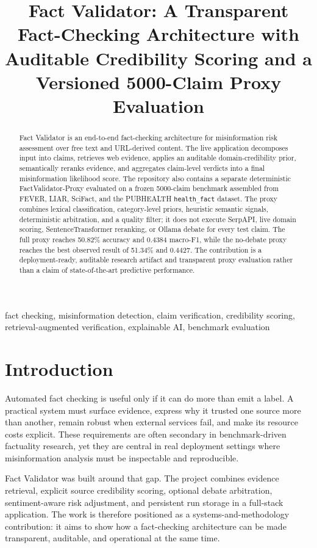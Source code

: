 \documentclass[conference]{IEEEtran}
\title{Fact Validator: A Transparent Fact-Checking Architecture with Auditable Credibility Scoring and a Versioned 5000-Claim Proxy Evaluation}
\author{\IEEEauthorblockN{Author One, Author Two, Author Three}
\IEEEauthorblockA{Department of Computer Engineering\\
University of Naples Federico II\\
Naples, Italy\\
author1@example.com, author2@example.com, author3@example.com}}
\begin{document}
\maketitle

\begin{abstract}
Fact Validator is an end-to-end fact-checking architecture for misinformation risk assessment over free text and URL-derived content. The live application decomposes input into claims, retrieves web evidence, applies an auditable domain-credibility prior, semantically reranks evidence, and aggregates claim-level verdicts into a final misinformation likelihood score. The repository also contains a separate deterministic FactValidator-Proxy evaluated on a frozen 5000-claim benchmark assembled from FEVER, LIAR, SciFact, and the PUBHEALTH \texttt{health\_fact} dataset. The proxy combines lexical classification, category-level priors, heuristic semantic signals, deterministic arbitration, and a quality filter; it does not execute SerpAPI, live domain scoring, SentenceTransformer reranking, or Ollama debate for every test claim. The full proxy reaches 50.82\% accuracy and 0.4384 macro-F1, while the no-debate proxy reaches the best observed result of 51.34\% and 0.4427. The contribution is a deployment-ready, auditable research artifact and transparent proxy evaluation rather than a claim of state-of-the-art predictive performance.
\end{abstract}

\begin{IEEEkeywords}
fact checking, misinformation detection, claim verification, credibility scoring, retrieval-augmented verification, explainable AI, benchmark evaluation
\end{IEEEkeywords}

\section{Introduction}

Automated fact checking is useful only if it can do more than emit a label. A practical system must surface evidence, express why it trusted one source more than another, remain robust when external services fail, and make its resource costs explicit. These requirements are often secondary in benchmark-driven factuality research, yet they are central in real deployment settings where misinformation analysis must be inspectable and reproducible.

Fact Validator was built around that gap. The project combines evidence retrieval, explicit source credibility scoring, optional debate arbitration, sentiment-aware risk adjustment, and persistent run storage in a full-stack application. The work is therefore positioned as a systems-and-methodology contribution: it aims to show how a fact-checking architecture can be made transparent, auditable, and operational at the same time.
\end{document}
